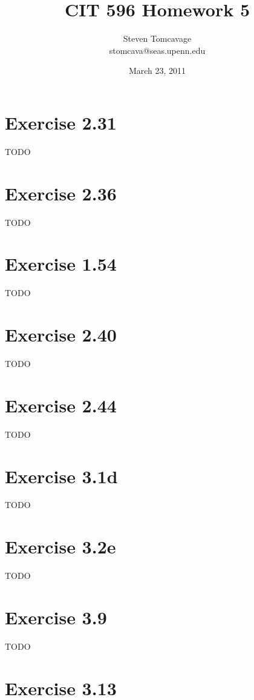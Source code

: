 \documentclass{article}
\title{CIT 596 Homework 5}
\author{Steven Tomcavage\\stomcava@seas.upenn.edu}
\date{March 23, 2011}
\begin{document}
\maketitle

\section{Exercise 2.31}

TODO 

\section{Exercise 2.36}

TODO 

\section{Exercise 1.54}

TODO 

\section{Exercise 2.40}

TODO 

\section{Exercise 2.44}

TODO 

\section{Exercise 3.1d}

TODO 

\section{Exercise 3.2e}

TODO 

\section{Exercise 3.9}

TODO 

\section{Exercise 3.13}
\end{document}
